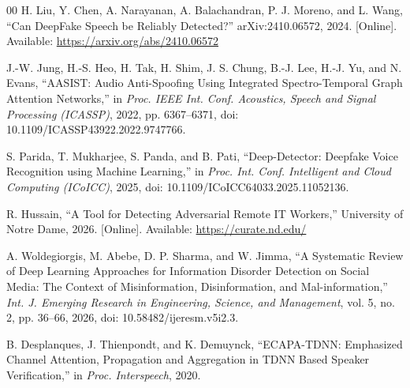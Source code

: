 \documentclass[conference]{IEEEtran}
\begin{document}
\begin{thebibliography}{00}
H. Liu, Y. Chen, A. Narayanan, A. Balachandran, P. J. Moreno, and L. Wang, ``Can DeepFake Speech be Reliably Detected?'' arXiv:2410.06572, 2024. [Online]. Available: \url{https://arxiv.org/abs/2410.06572}

J.-W. Jung, H.-S. Heo, H. Tak, H. Shim, J. S. Chung, B.-J. Lee, H.-J. Yu, and N. Evans, ``AASIST: Audio Anti-Spoofing Using Integrated Spectro-Temporal Graph Attention Networks,'' in \textit{Proc. IEEE Int. Conf. Acoustics, Speech and Signal Processing (ICASSP)}, 2022, pp. 6367--6371, doi: 10.1109/ICASSP43922.2022.9747766.

S. Parida, T. Mukharjee, S. Panda, and B. Pati, ``Deep-Detector: Deepfake Voice Recognition using Machine Learning,'' in \textit{Proc. Int. Conf. Intelligent and Cloud Computing (ICoICC)}, 2025, doi: 10.1109/ICoICC64033.2025.11052136.

R. Hussain, ``A Tool for Detecting Adversarial Remote IT Workers,'' University of Notre Dame, 2026. [Online]. Available: \url{https://curate.nd.edu/}

A. Woldegiorgis, M. Abebe, D. P. Sharma, and W. Jimma, ``A Systematic Review of Deep Learning Approaches for Information Disorder Detection on Social Media: The Context of Misinformation, Disinformation, and Mal-information,'' \textit{Int. J. Emerging Research in Engineering, Science, and Management}, vol. 5, no. 2, pp. 36--66, 2026, doi: 10.58482/ijeresm.v5i2.3.

B. Desplanques, J. Thienpondt, and K. Demuynck, ``ECAPA-TDNN: Emphasized Channel Attention, Propagation and Aggregation in TDNN Based Speaker Verification,'' in \textit{Proc. Interspeech}, 2020.

\end{thebibliography}
\end{document}
